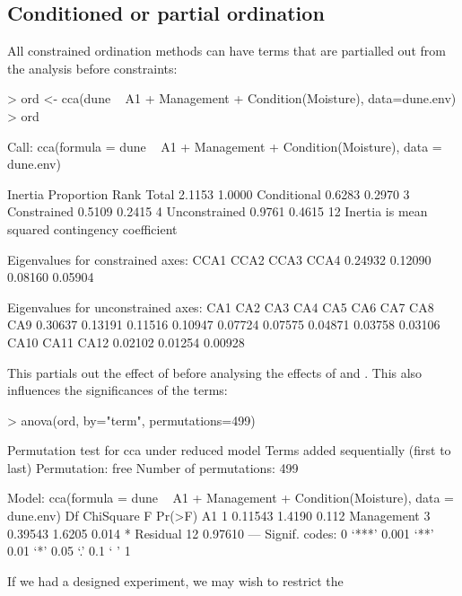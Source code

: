\documentclass[a4paper,10pt]{article}
\begin{document}
\subsection{Conditioned or partial ordination}

All constrained ordination methods can have terms that are partialled
out from the analysis before constraints:
\begin{Schunk}
\begin{Sinput}
> ord <- cca(dune ~ A1 + Management + Condition(Moisture), data=dune.env)
> ord
\end{Sinput}
\begin{Soutput}
Call: cca(formula = dune ~ A1 + Management +
Condition(Moisture), data = dune.env)

              Inertia Proportion Rank
Total          2.1153     1.0000     
Conditional    0.6283     0.2970    3
Constrained    0.5109     0.2415    4
Unconstrained  0.9761     0.4615   12
Inertia is mean squared contingency coefficient 

Eigenvalues for constrained axes:
   CCA1    CCA2    CCA3    CCA4 
0.24932 0.12090 0.08160 0.05904 

Eigenvalues for unconstrained axes:
    CA1     CA2     CA3     CA4     CA5     CA6     CA7     CA8     CA9 
0.30637 0.13191 0.11516 0.10947 0.07724 0.07575 0.04871 0.03758 0.03106 
   CA10    CA11    CA12 
0.02102 0.01254 0.00928 
\end{Soutput}
\end{Schunk}
This partials out the effect of  before analysing the
effects of  and .  This also influences
the significances of the terms:
\begin{Schunk}
\begin{Sinput}
> anova(ord, by="term", permutations=499)
\end{Sinput}
\begin{Soutput}
Permutation test for cca under reduced model
Terms added sequentially (first to last)
Permutation: free
Number of permutations: 499

Model: cca(formula = dune ~ A1 + Management + Condition(Moisture), data = dune.env)
           Df ChiSquare      F Pr(>F)  
A1          1   0.11543 1.4190  0.112  
Management  3   0.39543 1.6205  0.014 *
Residual   12   0.97610                
---
Signif. codes:  0 ‘***’ 0.001 ‘**’ 0.01 ‘*’ 0.05 ‘.’ 0.1 ‘ ’ 1
\end{Soutput}
\end{Schunk}
If we had a designed experiment, we may wish to restrict the
\end{document}
